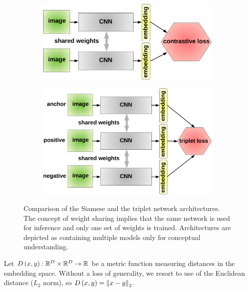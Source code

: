 \begin{figure}[t]
    \centering
    \begin{subfigure}[b]{0.49\textwidth}
        \centering
        \includegraphics[width=\textwidth]{figures/theoretical_foundations/siamese_architecture.pdf}
        \caption[]{}
    \end{subfigure}
    \hfill
    \begin{subfigure}[b]{0.49\textwidth}
        \centering
        \includegraphics[width=\textwidth]{figures/theoretical_foundations/triplet_architecture.pdf}
        \caption[]{}
    \end{subfigure}
    \caption[Contrastive and triplet loss]{Comparison of the Siamese  and the triplet  network architectures. The concept of weight sharing implies that the same network is used for inference and only one set of weights is trained. Architectures are depicted as containing multiple models only for conceptual understanding.}
    \label{fig:SiameseAndTripletArchitectures}
\end{figure}

Let ${D} \left( x, y \right): \mathbb{R}^D \times \mathbb{R}^D \to \mathbb{R}$ be a metric function measuring distances in the embedding space. Without a loss of generality, we resort to use of the Euclidean distance ($L_2$ norm), so ${D} \left( x, y \right) = {\left\Vert {x - y} \right\Vert}_2$.

